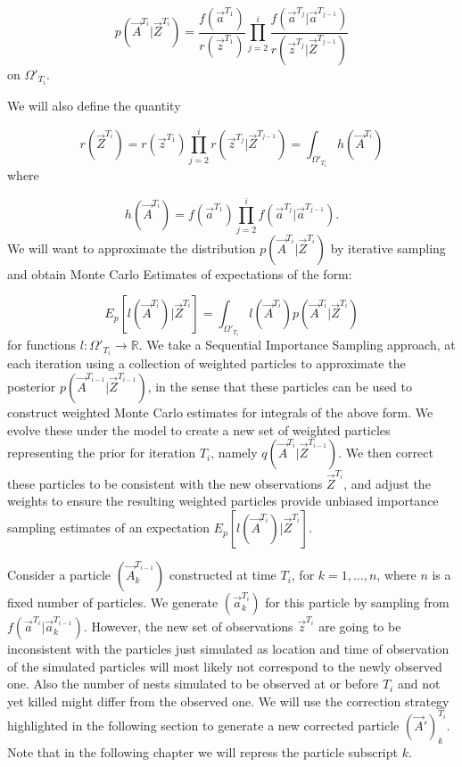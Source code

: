 {\begin{equation*}
    p(\vec{A}^{T_i} | \vec{Z}^{T_i}) = \frac{f(\vec{a}^{T_1})}{r(\vec{z}^{T_1})} \prod_{j=2}^{i} \frac{f(\vec{a}^{T_j} | \vec{a}^{T_{j-1}})}{r(\vec{z}^{T_j} | \vec{Z}^{T_{j-1}})}
\end{equation*}
on $\Omega'_{T_i}$.

We will also define the quantity

\begin{equation*}
    r(\vec{Z}^{T_i}) = r(\vec{z}^{T_1}) \prod_{j=2}^{i} r(\vec{z}^{T_j} | \vec{Z}^{T_{j-1}}) = \int_{{\Omega}'_{T_{i}}} h(\vec{A}^{T_i})
\end{equation*}
where

\begin{equation*}
    h(\vec{A}^{T_i}) = f(\vec{a}^{T_1}) \prod_{j=2}^{i} f(\vec{a}^{T_j} | \vec{a}^{T_{j-1}}).
\end{equation*}
We will want to approximate the distribution $p(\vec{A}^{T_i} | \vec{Z}^{T_i})$ by iterative sampling and obtain Monte Carlo Estimates of expectations of the form:

\begin{equation*}
    E_p[l(\vec{A}^{T_i}) | \vec{Z}^{T_i}] = \int_{\Omega'_{T_i}} l(\vec{A}^{T_i}) p(\vec{A}^{T_i} | \vec{Z}^{T_i})
\end{equation*}
for functions $l : \Omega'_{T_i} \rightarrow \mathbb{R}$.
We take a Sequential Importance Sampling approach, at each iteration using a collection of weighted particles to approximate the posterior $p(\vec{A}^{T_{i-1}} | \vec{Z}^{T_{i-1}})$, in the sense that these particles can be used to construct weighted Monte Carlo estimates for integrals of the above form. We evolve these under the model to create a new set of weighted particles representing the prior for iteration $T_i$, namely $q(\vec{A}^{T_i} | \vec{Z}^{T_{i-1}})$. We then correct these particles to be consistent with the new observations $\vec{Z}^{T_i}$, and adjust the weights to ensure the resulting weighted particles provide unbiased importance sampling estimates of an expectation $E_p[l(\vec{A}^{T_i}) | \vec{Z}^{T_i}]$.

Consider a particle $(\vec{A}_k^{T_{i-1}})$ constructed at time $T_i$, for $k = 1, \dots, n$, where $n$ is a fixed number of particles. We generate $(\vec{a}^{T_{i}}_k)$ for this particle by sampling from $f(\vec{a}^{T_i} | \vec{a}_k^{T_{i-1}})$. However, the new set of observations $\vec{z}^{T_i}$ are going to be inconsistent with the particles just simulated as location and time of observation of the simulated particles will most likely not correspond to the newly observed one. Also the number of nests simulated to be observed at or before $T_i$ and not yet killed might differ from the observed one. We will use the correction strategy highlighted in the following section to generate a new corrected particle $(\vec{A}')^{T_i}_k$. Note that in the following chapter we will repress the particle subscript $k$.

}

